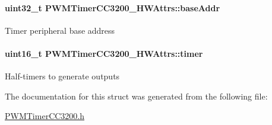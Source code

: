 \paragraph[{base\+Addr}]{\setlength{\rightskip}{0pt plus 5cm}uint32\+\_\+t P\+W\+M\+Timer\+C\+C3200\+\_\+\+H\+W\+Attrs\+::base\+Addr}\label{struct_p_w_m_timer_c_c3200___h_w_attrs_a2cc366b46e3f710f761ad990afa1aea0}
Timer peripheral base address 
\paragraph[{timer}]{\setlength{\rightskip}{0pt plus 5cm}uint16\+\_\+t P\+W\+M\+Timer\+C\+C3200\+\_\+\+H\+W\+Attrs\+::timer}\label{struct_p_w_m_timer_c_c3200___h_w_attrs_aa25fe5589d4a5c924759293c334fb40d}
Half-\/timers to generate outputs 

The documentation for this struct was generated from the following file\+:\begin{DoxyCompactItemize}
\item 
\hyperlink{_p_w_m_timer_c_c3200_8h}{P\+W\+M\+Timer\+C\+C3200.\+h}\end{DoxyCompactItemize}
